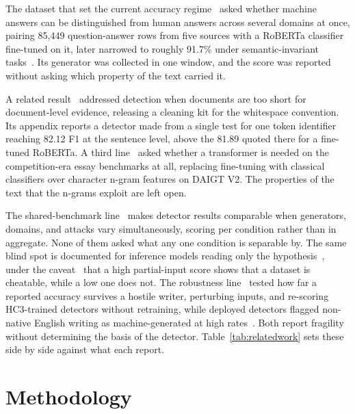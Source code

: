 \documentclass[conference,a4paper]{IEEEtran}
\newcommand{\tabref}[1]{\hyperref[#1]{\ref*{#1}}}
\begin{document}
The dataset that set the current accuracy regime~\cite{Guo2023close} asked whether machine answers can be distinguished from human answers across several domains at once, pairing 85,449 question-answer rows from five sources with a RoBERTa classifier fine-tuned on it, later narrowed to roughly 91.7\% under semantic-invariant tasks~\cite{Su2023plus}. Its generator was collected in one window, and the score was reported without asking which property of the text carried it.

A related result~\cite{Tian2023multiscale} addressed detection when documents are too short for document-level evidence, releasing a cleaning kit for the whitespace convention. Its appendix reports a detector made from a single test for one token identifier reaching 82.12 F1 at the sentence level, above the 81.89 quoted there for a fine-tuned RoBERTa. A third line~\cite{Zhou2024exploiting} asked whether a transformer is needed on the competition-era essay benchmarks at all, replacing fine-tuning with classical classifiers over character n-gram features on DAIGT V2. The properties of the text that the n-grams exploit are left open.

The shared-benchmark line~\cite{Dugan2024raid,Wang2024m4} makes detector results comparable when generators, domains, and attacks vary simultaneously, scoring per condition rather than in aggregate. None of them asked what any one condition is separable by. The same blind spot is documented for inference models reading only the hypothesis~\cite{Gururangan2018annotation,Poliak2018hypothesis,Geirhos2020shortcut}, under the caveat~\cite{Feng2019misleading} that a high partial-input score shows that a dataset is cheatable, while a low one does not. The robustness line~\cite{Antoun2023towards} tested how far a reported accuracy survives a hostile writer, perturbing inputs, and re-scoring HC3-trained detectors without retraining, while deployed detectors flagged non-native English writing as machine-generated at high rates~\cite{Liang2023gpt}. Both report fragility without determining the basis of the detector. Table~\tabref{tab:relatedwork} sets these side by side against what each report. %

\section{Methodology}
\label{sec:method}
\end{document}
